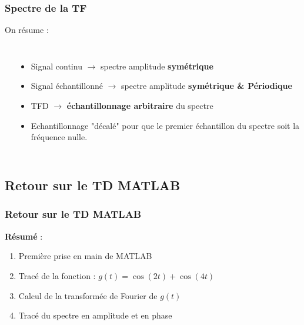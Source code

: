 \documentclass{beamer}
\begin{document}
\begin{frame}
\frametitle{Spectre de la TF}
On résume :
\begin{columns}
\column{60mm}
\begin{center}
\end{center}
\column{60mm}
\begin{itemize}
\item Signal continu $\rightarrow$ spectre amplitude \textbf{symétrique}
\vspace{0.3cm}
\item<2-> Signal échantillonné $\rightarrow$ spectre amplitude \textbf{symétrique \& Périodique}
\vspace{0.3cm}
\item<3-> TFD $\rightarrow$ \textbf{échantillonnage arbitraire} du spectre
\vspace{0.3cm}
\item<4-> Echantillonnage "décalé" pour que le premier échantillon du spectre soit la fréquence nulle.
\end{itemize}
\end{columns}
\end{frame}

\subsection{Retour sur le TD MATLAB}
\begin{frame}
\frametitle{Retour sur le TD MATLAB}
\textbf{Résumé }: 
\vspace{0.3cm}
\begin{enumerate}
\item Première prise en main de MATLAB
\vspace{0.3cm}
\item Tracé de la fonction : $g(t) = \cos(2t) + \cos(4t)$
\vspace{0.3cm}
\item Calcul de la transformée de Fourier de $g(t)$
\vspace{0.3cm}
\item Tracé du spectre en amplitude et en phase
\end{enumerate}
\end{frame}
\end{document}
